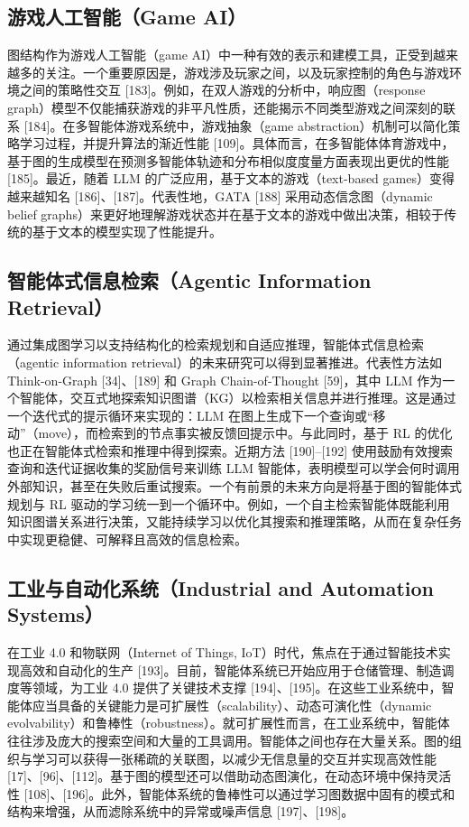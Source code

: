 \documentclass[10pt,UTF8,fontset=fandol]{ctexart}
\begin{document}
\subsection{游戏人工智能（Game AI）}

图结构作为游戏人工智能（game AI）中一种有效的表示和建模工具，正受到越来越多的关注。一个重要原因是，游戏涉及玩家之间，以及玩家控制的角色与游戏环境之间的策略性交互 [183]。例如，在双人游戏的分析中，响应图（response graph）模型不仅能捕获游戏的非平凡性质，还能揭示不同类型游戏之间深刻的联系 [184]。在多智能体游戏系统中，游戏抽象（game abstraction）机制可以简化策略学习过程，并提升算法的渐近性能 [109]。具体而言，在多智能体体育游戏中，基于图的生成模型在预测多智能体轨迹和分布相似度度量方面表现出更优的性能 [185]。最近，随着 LLM 的广泛应用，基于文本的游戏（text-based games）变得越来越知名 [186]、[187]。代表性地，GATA [188] 采用动态信念图（dynamic belief graphs）来更好地理解游戏状态并在基于文本的游戏中做出决策，相较于传统的基于文本的模型实现了性能提升。

\subsection{智能体式信息检索（Agentic Information Retrieval）}

通过集成图学习以支持结构化的检索规划和自适应推理，智能体式信息检索（agentic information retrieval）的未来研究可以得到显著推进。代表性方法如 Think-on-Graph [34]、[189] 和 Graph Chain-of-Thought [59]，其中 LLM 作为一个智能体，交互式地探索知识图谱（KG）以检索相关信息并进行推理。这是通过一个迭代式的提示循环来实现的：LLM 在图上生成下一个查询或“移动”（move），而检索到的节点事实被反馈回提示中。与此同时，基于 RL 的优化也正在智能体式检索和推理中得到探索。近期方法 [190]--[192] 使用鼓励有效搜索查询和迭代证据收集的奖励信号来训练 LLM 智能体，表明模型可以学会何时调用外部知识，甚至在失败后重试搜索。一个有前景的未来方向是将基于图的智能体式规划与 RL 驱动的学习统一到一个循环中。例如，一个自主检索智能体既能利用知识图谱关系进行决策，又能持续学习以优化其搜索和推理策略，从而在复杂任务中实现更稳健、可解释且高效的信息检索。

\subsection{工业与自动化系统（Industrial and Automation Systems）}

在工业 4.0 和物联网（Internet of Things, IoT）时代，焦点在于通过智能技术实现高效和自动化的生产 [193]。目前，智能体系统已开始应用于仓储管理、制造调度等领域，为工业 4.0 提供了关键技术支撑 [194]、[195]。在这些工业系统中，智能体应当具备的关键能力是可扩展性（scalability）、动态可演化性（dynamic evolvability）和鲁棒性（robustness）。就可扩展性而言，在工业系统中，智能体往往涉及庞大的搜索空间和大量的工具调用。智能体之间也存在大量关系。图的组织与学习可以获得一张稀疏的关联图，以减少无信息量的交互并实现高效性能 [17]、[96]、[112]。基于图的模型还可以借助动态图演化，在动态环境中保持灵活性 [108]、[196]。此外，智能体系统的鲁棒性可以通过学习图数据中固有的模式和结构来增强，从而滤除系统中的异常或噪声信息 [197]、[198]。
\end{document}
